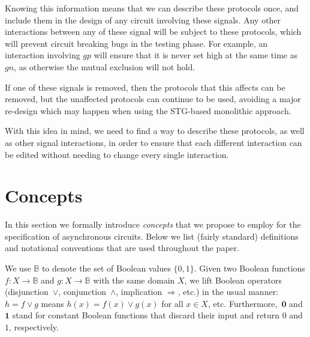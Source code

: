 \documentclass[british, journal]{IEEEtran}
\begin{document}
Knowing this information means that we can describe these protocols once, and
include them in the design of any circuit involving these signals. Any other
interactions between any of these signal will be subject to these protocols,
which will prevent circuit breaking bugs in the testing phase. For example, an
interaction involving $gp$ will ensure that it is never set high at
the same time as $gn$, as otherwise the mutual exclusion will not hold.

If one of these signals is removed, then the protocols that this affects can
be removed, but the unaffected protocols can continue to be used, avoiding a
major re-design which may happen when using the STG-based monolithic approach.

With this idea in mind, we need to find a way to describe these protocols, as
well as other signal interactions, in order to ensure that each different
interaction can be edited without needing to change every single interaction.

\vspace{-2mm}
\section{Concepts \label{sec:Concepts}}

In this section we formally introduce \emph{concepts} that we propose
to employ for the specification of asynchronous circuits. Below we
list (fairly standard) definitions and notational conventions that
are used throughout the paper.

We use $\mathbb{B}$ to denote the set of Boolean values $\{0,1\}$.
Given two Boolean functions $f:X\rightarrow\mathbb{B}$ and $g:X\rightarrow\mathbb{B}$
with the same domain $X$, we lift Boolean operators (disjunction~$\vee$,
conjunction~$\wedge$, implication $\Rightarrow$, etc.) in the usual
manner: $h=f\vee g$ means $h(x)=f(x)\vee g(x)$ for all $x\in X$,
etc. Furthermore,~$\mathbf{0}$ and~$\mathbf{1}$ stand for constant
Boolean functions that discard their input and return $0$
and $1$, respectively.
\end{document}
